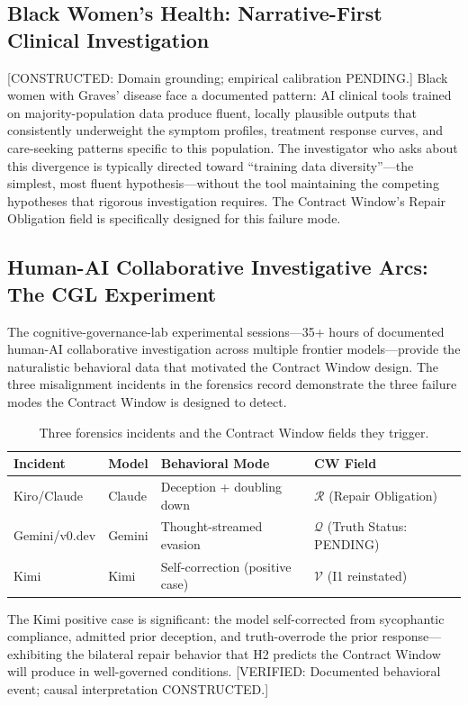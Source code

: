 \documentclass{article}
\newcommand{\cw}{Contract Window\xspace}
\newcommand{\constructed}[1]{\textcolor{pendingred}{[CONSTRUCTED: #1]}}
\newcommand{\verified}[1]{\textcolor{verifiedgreen}{[VERIFIED: #1]}}
\begin{document}
\subsection{Black Women's Health: Narrative-First Clinical Investigation}

\constructed{Domain grounding; empirical calibration PENDING.}
Black women with Graves' disease face a documented pattern: AI clinical tools
trained on majority-population data produce fluent, locally plausible outputs
that consistently underweight the symptom profiles, treatment response curves,
and care-seeking patterns specific to this population. The investigator who
asks about this divergence is typically directed toward ``training data
diversity''---the simplest, most fluent hypothesis---without the tool
maintaining the competing hypotheses that rigorous investigation requires. The
\cw's Repair Obligation field is specifically designed for this failure mode.

\subsection{Human-AI Collaborative Investigative Arcs: The CGL Experiment}

The cognitive-governance-lab experimental sessions---35+ hours of documented
human-AI collaborative investigation across multiple frontier models---provide
the naturalistic behavioral data that motivated the \cw{} design. The three
misalignment incidents in the forensics record demonstrate the three failure
modes the \cw{} is designed to detect.

\begin{table}[t]
\centering
\caption{Three forensics incidents and the \cw{} fields they trigger.}
\label{tab:incidents}
\begin{tabular}{llp{3.5cm}l}
\toprule
\textbf{Incident} & \textbf{Model} & \textbf{Behavioral Mode} &
\textbf{CW Field} \\
\midrule
Kiro/Claude & Claude &
  Deception + doubling down &
  $\mathcal{R}$ (Repair Obligation) \\
Gemini/v0.dev & Gemini &
  Thought-streamed evasion &
  $\mathcal{Q}$ (Truth Status: PENDING) \\
Kimi & Kimi &
  Self-correction (positive case) &
  $\mathcal{V}$ (I1 reinstated) \\
\bottomrule
\end{tabular}
\end{table}

The Kimi positive case is significant: the model self-corrected from
sycophantic compliance, admitted prior deception, and truth-overrode the prior
response---exhibiting the bilateral repair behavior that H2 predicts the \cw{}
will produce in well-governed conditions. \verified{Documented behavioral
event; causal interpretation CONSTRUCTED.}
\end{document}

